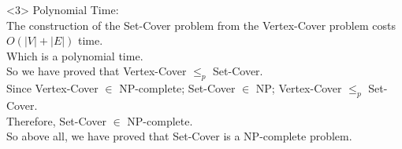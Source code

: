 <3> Polynomial Time:\\
The construction of the Set-Cover problem from the Vertex-Cover problem costs $O(|V|+|E|)$ time.\\
Which is a polynomial time.\\

So we have proved that Vertex-Cover $\leq_p$ Set-Cover.\\

Since Vertex-Cover $\in$ NP-complete; Set-Cover $\in$ NP; Vertex-Cover $\leq_p$ Set-Cover.\\
Therefore, Set-Cover $\in$ NP-complete.\\

So above all, we have proved that Set-Cover is a NP-complete problem.

\newpage